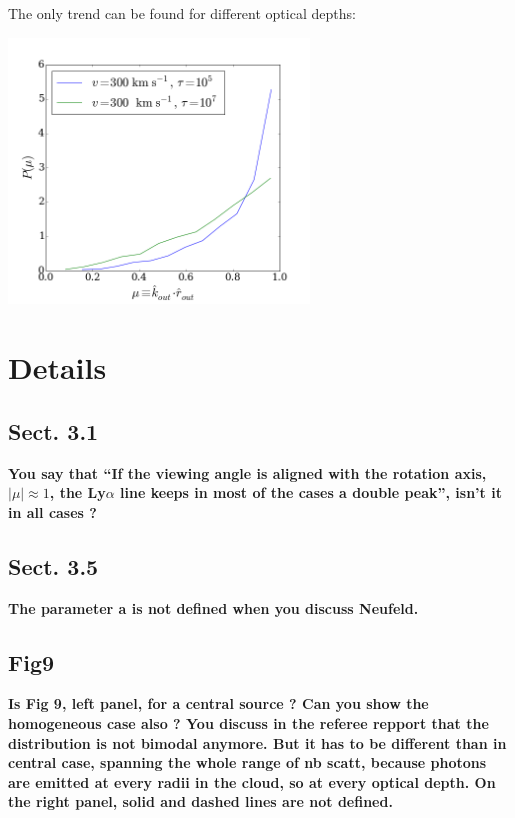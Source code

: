 \documentclass[12pt]{article}
\begin{document}
The only trend can be found for different optical depths:

\begin{center}
\includegraphics[width=0.6\textwidth]{./surface_mu_diff_tau.png}
\end{center}

\section*{Details}

\subsection*{Sect. 3.1}

{\bf You say that “If the viewing angle is aligned with the rotation
  axis, $|\mu| \approx 1$, the Ly$\alpha$ line keeps in most of the
  cases a double peak”, isn’t it in all cases ?} 

\subsection*{Sect. 3.5}
{\bf The parameter a is not defined when you discuss Neufeld.} 

\subsection*{Fig9}

{\bf Is Fig 9, left panel, for a central source ? Can you show the
  homogeneous case also ? You discuss in the referee repport that the
  distribution is not bimodal anymore. But it has to be different than
  in central case, spanning the whole range of nb scatt, because
  photons are emitted at every radii in the cloud, so at every optical
  depth. On the right panel, solid and dashed lines are not defined.}
   
\end{document}
